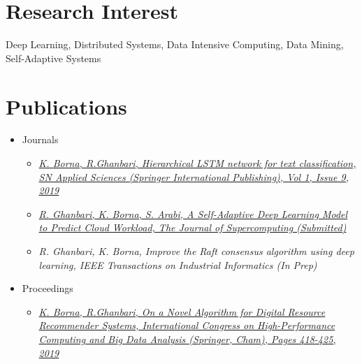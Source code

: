 \documentclass[letterpaper,11pt]{article}
\begin{document}
\section{Research Interest}
{\small {Deep Learning, Distributed Systems, Data Intensive Computing, Data Mining, Self-Adaptive Systems}\\


\section{Publications}
\begin{itemize}
	\item Journals
	\begin{itemize}
	\item \href{https://link.springer.com/article/10.1007/s42452-019-1165-1}{\textit {K. Borna, R.Ghanbari, Hierarchical LSTM network for text classification, SN Applied Sciences (Springer International Publishing), Vol 1, Issue 9, 2019}}\\
    \item \href{https://www.editorialmanager.com/supe/download.aspx?id=133745&guid=\%7B2E1939F1-F2AF-407A-96F9-5E116519961A\%7D&scheme=12}{\textit {R. Ghanbari, K. Borna, S. Arabi, A Self-Adaptive Deep Learning Model to Predict Cloud Workload, The Journal of Supercomputing (Submitted)}}\\
	\item {\textit{R. Ghanbari, K. Borna, Improve the Raft consensus algorithm using deep learning, IEEE Transactions on Industrial Informatics (In Prep)}}\\
	\end{itemize}
	\item Proceedings
	\begin{itemize}
	\item \href{https://link.springer.com/chapter/10.1007\%2F978-3-030-33495-6_32}{\textit {K. Borna, R.Ghanbari, On a Novel Algorithm for Digital Resource Recommender Systems, International Congress on High-Performance Computing and Big Data Analysis (Springer, Cham), Pages 418-425, 2019}}
	\end{itemize}
	\end{itemize}


}
\end{document}
